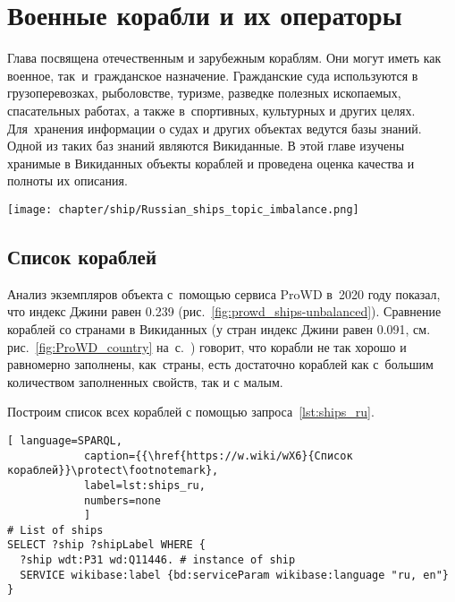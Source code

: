 \chapter{Военные корабли и их операторы}
\label{ch:ships-chapter}

Глава посвящена отечественным и зарубежным кораблям. 
Они могут иметь как военное, так~и~гражданское назначение. 
Гражданские суда используются в грузоперевозках, рыболовстве, туризме, 
разведке полезных ископаемых, спасательных работах, 
а также в~спортивных, культурных и других целях. 
Для~хранения информации о судах и других объектах ведутся базы знаний. 
Одной из таких баз знаний являются Викиданные. 
В этой главе изучены хранимые в Викиданных объекты кораблей и проведена оценка качества и полноты их описания.


\begin{marginfigure}[0.0cm]
  \texttt{[image: chapter/ship/Russian\_ships\_topic\_imbalance.png]}
  \caption{Индекс Джини~--- равномерность заполнения свойств <<кораблей>>, 2020 год}
  \label{fig:prowd_ships-unbalanced}%
\end{marginfigure}


\section{Список кораблей}

Анализ экземпляров объекта  
с~помощью сервиса ProWD в~2020 году показал, 
что индекс Джини равен 0.239 (рис.~\ref{fig:prowd_ships-unbalanced}). 
%
Сравнение кораблей со странами в Викиданных 
(у стран индекс Джини равен 0.091, см. рис.~\ref{fig:ProWD_country} 
                                  на~с.~\pageref{fig:ProWD_country}) 
говорит, что корабли не так хорошо и равномерно заполнены, как~страны, 
есть достаточно кораблей как с~большим количеством заполненных свойств, 
так и с малым.

Построим список всех кораблей с помощью запроса~\ref{lst:ships_ru}.


\begin{lstlisting}[ language=SPARQL, 
            caption={{\href{https://w.wiki/wX6}{Список кораблей}}\protect\footnotemark}, 
            label=lst:ships_ru, 
            numbers=none
            ]
# List of ships
SELECT ?ship ?shipLabel WHERE {
  ?ship wdt:P31 wd:Q11446. # instance of ship
  SERVICE wikibase:label {bd:serviceParam wikibase:language "ru, en"}
}
\end{lstlisting}


